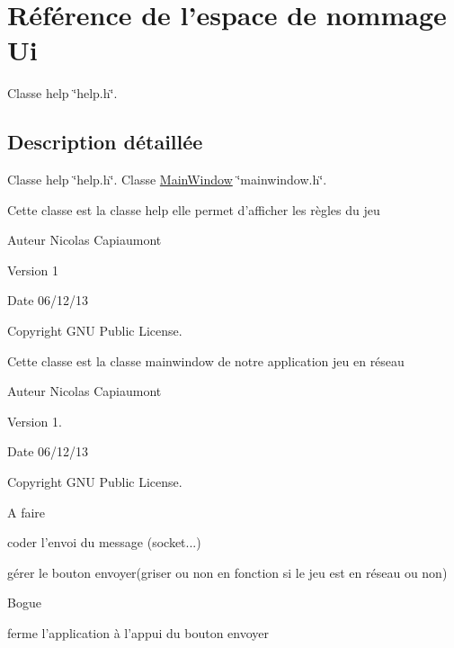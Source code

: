\hypertarget{namespace_ui}{\section{Référence de l'espace de nommage Ui}
\label{namespace_ui}
}


Classe help \char`\"{}help.\-h\char`\"{}.  




\subsection{Description détaillée}
Classe help \char`\"{}help.\-h\char`\"{}. Classe \hyperlink{class_main_window}{Main\-Window} \char`\"{}mainwindow.\-h\char`\"{}.

Cette classe est la classe help elle permet d'afficher les règles du jeu \begin{DoxyAuthor}{Auteur}
Nicolas Capiaumont 
\end{DoxyAuthor}
\begin{DoxyVersion}{Version}
1 
\end{DoxyVersion}
\begin{DoxyDate}{Date}
06/12/13 
\end{DoxyDate}
\begin{DoxyCopyright}{Copyright}
G\-N\-U Public License.
\end{DoxyCopyright}
Cette classe est la classe mainwindow de notre application jeu en réseau \begin{DoxyAuthor}{Auteur}
Nicolas Capiaumont 
\end{DoxyAuthor}
\begin{DoxyVersion}{Version}
1. 
\end{DoxyVersion}
\begin{DoxyDate}{Date}
06/12/13 
\end{DoxyDate}
\begin{DoxyCopyright}{Copyright}
G\-N\-U Public License. 
\end{DoxyCopyright}
\begin{DoxyRefDesc}{A faire}
\item[\hyperlink{todo__todo000001}{A faire}]coder l'envoi du message (socket...) 

gérer le bouton envoyer(griser ou non en fonction si le jeu est en réseau ou non) \end{DoxyRefDesc}
\begin{DoxyRefDesc}{Bogue}
\item[\hyperlink{bug__bug000001}{Bogue}]ferme l'application à l'appui du bouton envoyer \end{DoxyRefDesc}
